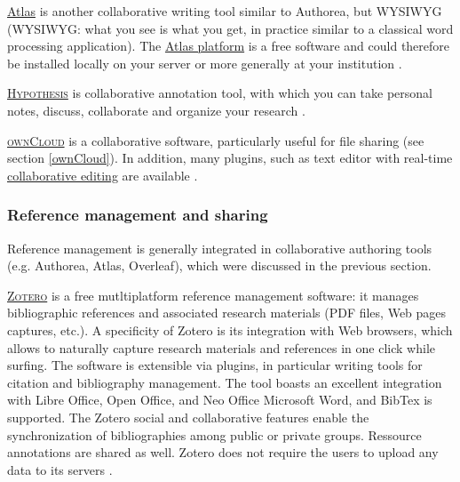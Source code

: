 \vspace{0.4cm}

\noindent {} \href{http://atlas.oreiley.com}{Atlas} is another collaborative writing tool similar to Authorea, but WYSIWYG (WYSIWYG: what you see is what you get, in practice similar to a classical word processing application). The \href{https://github.com/oreillymedia/Getting-Started-with-Atlas}{Atlas platform} is a free software and could therefore be installed locally on your server or more generally at your institution \cite{oreilly_atlas_2015,authorea_authorea:_2015,oreilley_getting-started--atlas_2015}.

\vspace{0.4cm}

\noindent {} \textsc{\href{https://hypothes.is}{Hypothesis}} is collaborative annotation tool, with which you can take personal notes, discuss, collaborate and organize your research \cite{hypothes.is_hypothesis_2015}.

\vspace{0.4cm}

\noindent {} \textsc{\href{http://owncloud.org}{ownCloud}} is a collaborative software, particularly useful for file sharing (see section \ref{ownCloud}). In addition, many plugins, such as text editor with real-time \href{https://www.youtube.com/watch?v=xsqSLeppxm0}{collaborative editing} are available \cite{owncloud_owncloud.org_2015}. 

%
%

\subsubsection{Reference management and sharing}

Reference management is generally integrated in collaborative authoring tools (e.g. Authorea, Atlas, Overleaf), which were discussed in the previous section.

\vspace{0.4cm}

\noindent {} \textsc{\href{https://www.zotero.org/}{Zotero}} is a free mutltiplatform reference management software: it manages bibliographic references and associated research materials (PDF files, Web pages captures, etc.). A specificity of Zotero is its integration with Web browsers, which allows to naturally capture research materials and references in one click while surfing. The software is extensible via plugins, in particular writing tools for citation and bibliography management. The tool boasts an excellent integration with Libre Office, Open Office, and Neo Office Microsoft Word, and BibTex is supported. The Zotero social and collaborative features enable the synchronization of bibliographies among public or private groups. Ressource annotations are shared as well. Zotero does not require the users to upload any data to its servers \cite{zotero.org_zotero_2015}.


